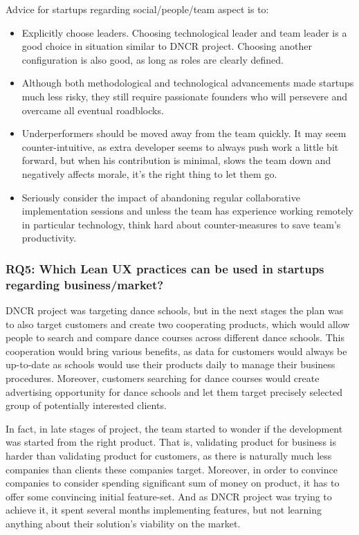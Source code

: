 \documentclass{article}
\begin{document}
Advice for startups regarding social/people/team aspect is to:
\begin{itemize}
\item Explicitly choose leaders. Choosing technological leader and team leader is a good choice in situation similar to DNCR project. Choosing another configuration is also good, as long as roles are clearly defined.
\item Although both methodological and technological advancements made startups much less risky, they still require passionate founders who will persevere and overcame all eventual roadblocks.
\item Underperformers should be moved away from the team quickly. It may seem counter-intuitive, as extra developer seems to always push work a little bit forward, but when his contribution is minimal, slows the team down and negatively affects morale, it's the right thing to let them go.
\item Seriously consider the impact of abandoning regular collaborative implementation sessions and unless the team has experience working remotely in particular technology, think hard about counter-measures to save team's productivity.
\end{itemize}

\subsubsection{RQ5: Which Lean UX practices can be used in startups regarding business/market?}
DNCR project was targeting dance schools, but in the next stages the plan was to also target customers and create two cooperating products, which would allow people to search and compare dance courses across different dance schools. This cooperation would bring various benefits, as data for customers would always be up-to-date as schools would use their products daily to manage their business procedures. Moreover, customers searching for dance courses would create advertising opportunity for dance schools and let them target precisely selected group of potentially interested clients.

In fact, in late stages of project, the team started to wonder if the development was started from the right product. That is, validating product for business is harder than validating product for customers, as there is naturally much less companies than clients these companies target. Moreover, in order to convince companies to consider spending significant sum of money on product, it has to offer some convincing initial feature-set. And as DNCR project was trying to achieve it, it spent several months implementing features, but not learning anything about their solution's viability on the market.
\end{document}
